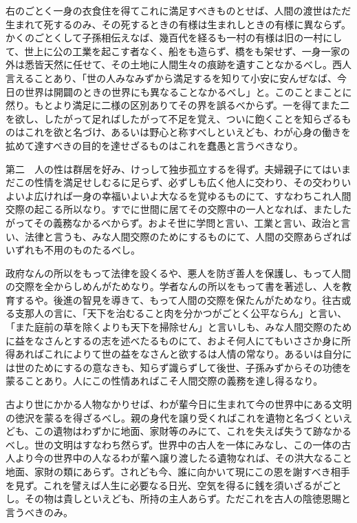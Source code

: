 \documentclass[a4paper, platex, dvipdfmx]{jsarticle}
\begin{document}
右のごとく一身の衣食住を得てこれに満足すべきものとせば、人間の渡世はただ生まれて死するのみ、その死するときの有様は生まれしときの有様に異ならず。かくのごとくして子孫相伝えなば、幾百代を経るも一村の有様は旧の一村にして、世上に公の工業を起こす者なく、船をも造らず、橋をも架せず、一身一家の外は悉皆天然に任せて、その土地に人間生々の痕跡を遺すことなかるべし。西人言えることあり、「世の人みなみずから満足するを知りて小安に安んぜなば、今日の世界は開闢のときの世界にも異なることなかるべし」と。このことまことに然り。もとより満足に二様の区別ありてその界を誤るべからず。一を得てまた二を欲し、したがって足ればしたがって不足を覚え、ついに飽くことを知らざるものはこれを欲と名づけ、あるいは野心と称すべしといえども、わが心身の働きを拡めて達すべきの目的を達せざるものはこれを蠢愚と言うべきなり。

第二　人の性は群居を好み、けっして独歩孤立するを得ず。夫婦親子にてはいまだこの性情を満足せしむるに足らず、必ずしも広く他人に交わり、その交わりいよいよ広ければ一身の幸福いよいよ大なるを覚ゆるものにて、すなわちこれ人間交際の起こる所以なり。すでに世間に居てその交際中の一人となれば、またしたがってその義務なかるべからず。およそ世に学問と言い、工業と言い、政治と言い、法律と言うも、みな人間交際のためにするものにて、人間の交際あらざればいずれも不用のものたるべし。

政府なんの所以をもって法律を設くるや、悪人を防ぎ善人を保護し、もって人間の交際を全からしめんがためなり。学者なんの所以をもって書を著述し、人を教育するや。後進の智見を導きて、もって人間の交際を保たんがためなり。往古或る支那人の言に、「天下を治むること肉を分かつがごとく公平ならん」と言い、「また庭前の草を除くよりも天下を掃除せん」と言いしも、みな人間交際のために益をなさんとするの志を述べたるものにて、およそ何人にてもいささか身に所得あればこれによりて世の益をなさんと欲するは人情の常なり。あるいは自分には世のためにするの意なきも、知らず識らずして後世、子孫みずからその功徳を蒙ることあり。人にこの性情あればこそ人間交際の義務を達し得るなり。

古より世にかかる人物なかりせば、わが輩今日に生まれて今の世界中にある文明の徳沢を蒙るを得ざるべし。親の身代を譲り受くればこれを遺物と名づくといえども、この遺物はわずかに地面、家財等のみにて、これを失えば失うて跡なかるべし。世の文明はすなわち然らず。世界中の古人を一体にみなし、この一体の古人より今の世界中の人なるわが輩へ譲り渡したる遺物なれば、その洪大なること地面、家財の類にあらず。されども今、誰に向かいて現にこの恩を謝すべき相手を見ず。これを譬えば人生に必要なる日光、空気を得るに銭を須いざるがごとし。その物は貴しといえども、所持の主人あらず。ただこれを古人の陰徳恩賜と言うべきのみ。
\end{document}
